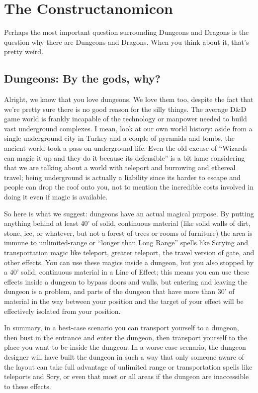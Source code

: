 \chapter{The Constructanomicon}
\vspace*{-10pt}

Perhaps the most important question surrounding Dungeons and Dragons is the question why there are Dungeons and Dragons. When you think about it, that's pretty weird.

\section{Dungeons: By the gods, why?}

Alright, we know that you love dungeons. We love them too, despite the fact that we're pretty sure there is no good reason for the silly things. The average D\&D game world is frankly incapable of the technology or manpower needed to build vast underground complexes. I mean, look at our own world history: aside from a single underground city in Turkey and a couple of pyramids and tombs, the ancient world took a pass on underground life. Even the old excuse of ``Wizards can magic it up and they do it because its defensible'' is a bit lame considering that we are talking about a world with teleport and burrowing and ethereal travel; being underground is actually a liability since its harder to escape and people can drop the roof onto you, not to mention the incredible costs involved in doing it even if magic is available.

So here is what we suggest: dungeons have an actual magical purpose. By putting anything behind at least 40' of solid, continuous material (like solid walls of dirt, stone, ice, or whatever, but not a forest of trees or rooms of furniture) the area is immune to unlimited-range or ``longer than Long Range'' spells like Scrying and transportation magic like teleport, greater teleport, the travel version of gate, and other effects. You can use these magics inside a dungeon, but you also stopped by a 40' solid, continuous material in a Line of Effect; this means you can use these effects inside a dungeon to bypass doors and walls, but entering and leaving the dungeon is a problem, and parts of the dungeon that have more than 30' of material in the way between your position and the target of your effect will be effectively isolated from your position.

In summary, in a best-case scenario you can transport yourself to a dungeon, then bust in the entrance and enter the dungeon, then transport yourself to the place you want to be inside the dungeon. In a worse-case scenario, the dungeon designer will have built the dungeon in such a way that only someone aware of the layout can take full advantage of unlimited range or transportation spells like teleports and Scry, or even that most or all areas if the dungeon are inaccessible to these effects.

